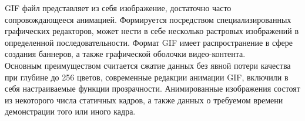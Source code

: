 \documentclass{beamer}
\begin{document}
\begin{frame}
GIF файл представляет из себя изображение, достаточно часто сопровождающееся анимацией. Формируется посредством специализированных графических редакторов, может нести в себе несколько растровых изображений в определенной последовательности. Формат GIF имеет распространение в сфере создания баннеров, а также графической оболочки видео-контента.\\
Основным преимуществом считается сжатие данных без явной потери качества при глубине до 256 цветов, современные редакции анимации GIF, включили в себя настраиваемые функции прозрачности. Анимированные изображения состоят из некоторого числа статичных кадров, а также данных о требуемом времени демонстрации того или иного кадра.\\
\begin{figure}[H]
\begin{center}
\begin{minipage}[h]{0.25\linewidth}
  \\
\end{minipage}
\end{center}
\end{figure}
\end{frame}
\end{document}
